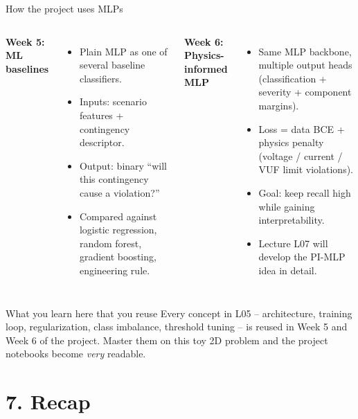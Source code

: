 \documentclass[aspectratio=169,10pt]{beamer}
\begin{document}
\begin{frame}{How the project uses MLPs}
\begin{columns}[T]
\textbf{Week 5: ML baselines}
\begin{itemize}
  \item Plain MLP as one of several baseline classifiers.
  \item Inputs: scenario features + contingency descriptor.
  \item Output: binary ``will this contingency cause a violation?''
  \item Compared against logistic regression, random forest, gradient boosting, engineering rule.
\end{itemize}
\textbf{Week 6: Physics-informed MLP}
\begin{itemize}
  \item Same MLP backbone, multiple output heads (classification + severity + component margins).
  \item Loss = data BCE + physics penalty (voltage / current / VUF limit violations).
  \item Goal: keep recall high while gaining interpretability.
  \item Lecture L07 will develop the PI-MLP idea in detail.
\end{itemize}
\end{columns}
\vspace{0.5em}
\begin{block}{What you learn here that you reuse}
Every concept in L05 -- architecture, training loop, regularization, class imbalance, threshold tuning -- is reused in Week 5 and Week 6 of the project. Master them on this toy 2D problem and the project notebooks become \emph{very} readable.
\end{block}
\end{frame}

\section*{7. Recap}
\end{document}

